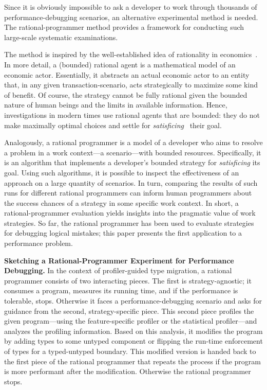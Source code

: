 Since it is obviously impossible to ask a developer to work through thousands of
performance-debugging scenarios, an alternative experimental method is needed.
The rational-programmer method provides a framework for conducting such
large-scale systematic examinations.

The method is inspired by the well-established idea of rationality in
economics~\cite{mill1874essays, henrich2001search}.  In more detail, a (bounded)
rational agent is a mathematical model of an economic actor. Essentially, it
abstracts an actual economic actor to an entity that, in any given
transaction-scenario, acts strategically to maximize some kind of benefit.  Of
course, the strategy cannot be fully rational given the bounded nature of human
beings and the limits in available information. Hence, investigations in modern
times use rational agents that are bounded: they do not make maximally optimal
choices and settle for \emph{satisficing}~\cite{hs:satisfice} their goal.

Analogously, a rational programmer is a model of a developer who aims to resolve
a problem in a work context---a scenario---with bounded
resources. Specifically, it is an algorithm that implements a developer's
bounded strategy for \emph{satisficing} its goal. Using such algorithms, it is
possible to inspect the effectiveness of an approach on a large quantity of
scenarios. In turn, comparing the results of such runs for different rational
programmers can inform human programmers about the success chances of a strategy
in some specific work context. In short, a rational-programmer evaluation yields
insights into the pragmatic value of work strategies. So far, the rational
programmer has been used to evaluate strategies for debugging logical mistakes;
this paper presents the first application to a performance problem. 

\medskip

\noindent\textbf{Sketching a Rational-Programmer Experiment for Performance Debugging.}
In the context of profiler-guided type migration, a rational programmer consists
of two interacting pieces.  The first is strategy-agnostic; it consumes a
program, measures its running time, and if the performance is tolerable,
stops. Otherwise it faces a performance-debugging scenario and asks for guidance
from the second, strategy-specific piece. This second piece profiles the given
program---using the feature-specific profiler or the statistical profiler---and
analyzes the profiling information. Based on this analysis, it modifies the
program by adding types to some untyped component or flipping the run-time
enforcement of types for a typed-untyped boundary. This modified version is
handed back to the first piece of the rational programmer that repeats the
process if the program is more performant after the modification.
Otherwise the rational programmer stops. 


